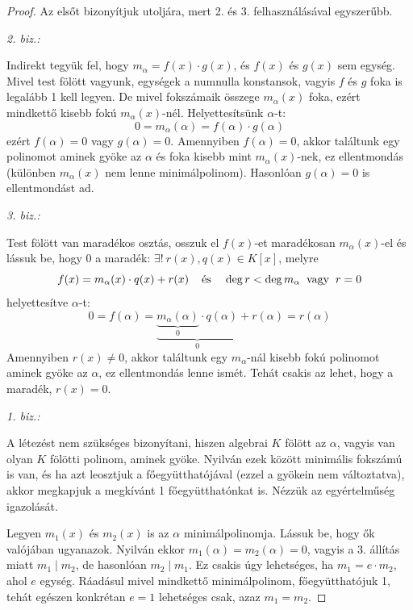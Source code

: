 \documentclass[12pt]{book}
\theoremstyle{plain} %
\theoremstyle{definition} %
\theoremstyle{remark}
\numberwithin{equation}{section}  %
\begin{document}
	\begin{proof}
		Az elsőt bizonyítjuk utoljára, mert 2. és 3. felhasználásával egyszerűbb.
		
		\textit{2. biz.:}
		
		Indirekt tegyük fel, hogy $m_\alpha = f(x)\cdot g(x)$, és $f(x)$ és $g(x)$ sem egység. Mivel test fölött vagyunk, egységek a numnulla konstansok, vagyis $f$ és $g$ foka is legalább 1 kell legyen. De mivel fokszámaik összege $m_\alpha(x)$ foka, ezért mindkettő kisebb fokú $m_\alpha(x)$-nél. Helyettesítsünk $\alpha$-t:
		\[ 0 = m_\alpha(\alpha) = f(\alpha) \cdot g(\alpha)  \]
		ezért $f(\alpha)=0$ vagy $g(\alpha)=0$. Amennyiben $f(\alpha)=0$, akkor találtunk egy polinomot aminek gyöke az $\alpha$ és foka kisebb mint $m_\alpha(x)$-nek, ez ellentmondás (különben $m_\alpha(x)$ nem lenne minimálpolinom). Hasonlóan $g(\alpha)=0$ is ellentmondást ad.
		
		\textit{3. biz.:}
		
		Test fölött van maradékos osztás, osszuk el $f(x)$-et maradékosan $m_\alpha(x)$-el és lássuk be, hogy $0$ a maradék: $\exists!\ r(x),q(x)\in K[x]$, melyre
		\[ f(x) = m_\alpha(x) \cdot q(x) + r(x) \hspace{4mm} \text{és} \hspace{4mm} \deg r < \deg m_\alpha \hspace{2mm} \text{vagy} \hspace{2mm} r=0  \]
		helyettesítve $\alpha$-t:
		\[ 0 = f(\alpha) = \underbrace{\underbrace{m_\alpha(\alpha)}_{0}\cdot q(\alpha)}_{0} + r(\alpha) = r(\alpha) \]
		Amennyiben $r(x)\neq 0$, akkor találtunk egy $m_\alpha$-nál kisebb fokú polinomot aminek gyöke az $\alpha$, ez ellentmondás lenne ismét. Tehát csakis az lehet, hogy a maradék, $r(x)=0$.
		
		\textit{1. biz.:}
		
		A létezést nem szükséges bizonyítani, hiszen algebrai $K$ fölött az $\alpha$, vagyis van olyan $K$ fölötti polinom, aminek gyöke. Nyilván ezek között minimális fokszámú is van, és ha azt leosztjuk a főegyütthatójával (ezzel a gyökein nem változtatva), akkor megkapjuk a megkívánt 1 főegyütthatónkat is. Nézzük az egyértelműség igazolását.
		
		Legyen $m_1(x)$ és $m_2(x)$	is az $\alpha$ minimálpolinomja. Lássuk be, hogy ők valójában ugyanazok. Nyilván ekkor $m_1(\alpha)=m_2(\alpha)=0$, vagyis a 3. állítás miatt $m_1 \mid m_2$, de hasonlóan $m_2\mid m_1$. Ez csakis úgy lehetséges, ha $m_1 = e\cdot m_2$, ahol $e$ egység. Ráadásul mivel mindkettő minimálpolinom, főegyütthatójuk 1, tehát egészen konkrétan $e=1$ lehetséges csak, azaz $m_1 = m_2$.	
	\end{proof}
	
\end{document}
